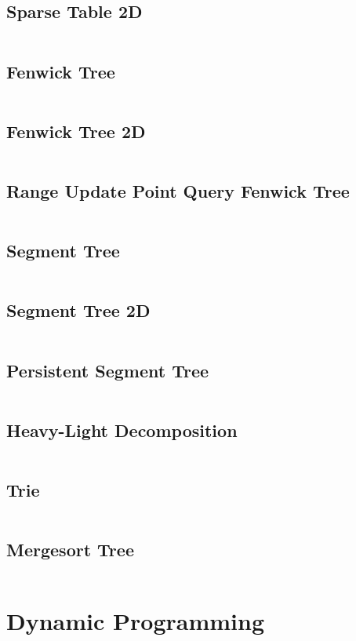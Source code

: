 \documentclass[a4paper, 10pt, twocolumn, landscape]{article}
\begin{document}
  \subsection{Sparse Table 2D}
  \inputminted{cpp}{data-structures/sparse2d.cpp}
  \subsection{Fenwick Tree}
  \inputminted{cpp}{data-structures/bit.cpp}
  \subsection{Fenwick Tree 2D}
  \inputminted{cpp}{data-structures/bit2d.cpp}
  \subsection{Range Update Point Query Fenwick Tree}
  \inputminted{cpp}{data-structures/bit-range.cpp}
  \subsection{Segment Tree}
  \inputminted{cpp}{data-structures/segtree.cpp}
  \subsection{Segment Tree 2D}
  \inputminted{cpp}{data-structures/segtree2d.cpp}
  \subsection{Persistent Segment Tree}
  \inputminted{cpp}{data-structures/persistent-segtree.cpp}
  \subsection{Heavy-Light Decomposition}
  \inputminted{cpp}{data-structures/hld.cpp}
  \subsection{Trie}
  \inputminted{cpp}{data-structures/trie.cpp}
  \subsection{Mergesort Tree}
  \inputminted{cpp}{data-structures/mergesort-tree.cpp}

  \section{Dynamic Programming}
\end{document}
